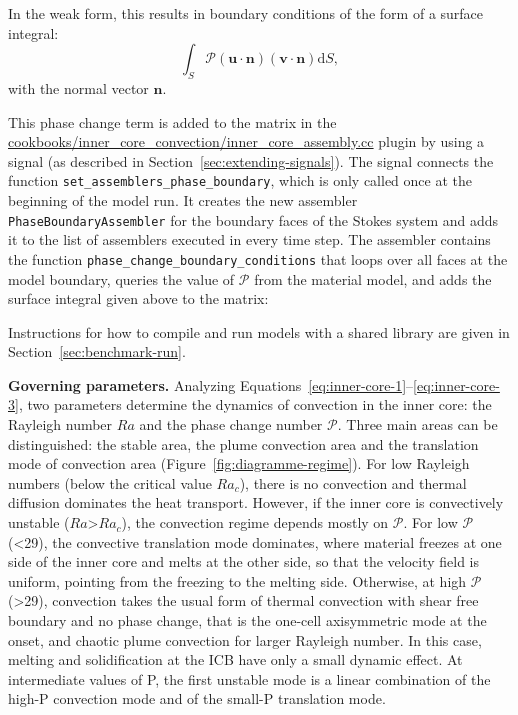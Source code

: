 \documentclass{article}
\begin{document}
In the weak form, this results in boundary conditions of the form
of a surface integral:
\begin{equation*}
\int_S \mathcal{P} (\mathbf u \cdot \mathbf n) (\mathbf v \cdot \mathbf n) \text{d}S,
\end{equation*}
with the normal vector $\mathbf n$.

This phase change term is added to the matrix in the
\url{cookbooks/inner_core_convection/inner_core_assembly.cc} plugin by using a signal
(as described in Section~\ref{sec:extending-signals}). The signal
connects the function \verb!set_assemblers_phase_boundary!, which is only called once at the beginning of
the model run. It creates the new assembler \texttt{PhaseBoundaryAssembler} for the boundary faces of the Stokes
system and adds it to the list of assemblers executed in every time step.
The assembler contains the function \verb!phase_change_boundary_conditions! that loops over all faces at the model
boundary, queries the value of $\mathcal{P}$ from the material model, and adds the surface integral given above
to the matrix:

Instructions for how to compile and run models with a shared library are given in Section~\ref{sec:benchmark-run}.

\vspace{0.3cm}
\textbf{Governing parameters.}  Analyzing Equations~\eqref{eq:inner-core-1}--\eqref{eq:inner-core-3}, two parameters determine
the dynamics of convection in the inner core: the Rayleigh number $Ra$ and the phase change number $\mathcal{P}$.
Three main areas can be distinguished: the stable area, the plume convection area and the translation mode of convection area (Figure~\ref{fig:diagramme-regime}). For low Rayleigh numbers (below the critical value $Ra_c$), there is no convection and thermal diffusion dominates the heat transport. However, if the inner core is convectively unstable ($Ra$>$Ra_c$), the convection regime depends mostly on $\mathcal{P}$. For low $\mathcal{P}$ (<29), the convective translation mode dominates, where material freezes at one side of the inner core and melts at the other side, so that the velocity field is uniform, pointing from the freezing to the melting side. Otherwise, at high $\mathcal{P}$ (>29), convection takes the usual form of thermal convection with shear free boundary and no phase change, that is the one-cell axisymmetric mode at the onset, and chaotic plume convection for larger Rayleigh number. In this case, melting and solidification at the ICB have only a small dynamic effect. At intermediate values of P, the first unstable mode is a linear combination of the high-P convection mode and of the small-P translation mode.
\end{document}
